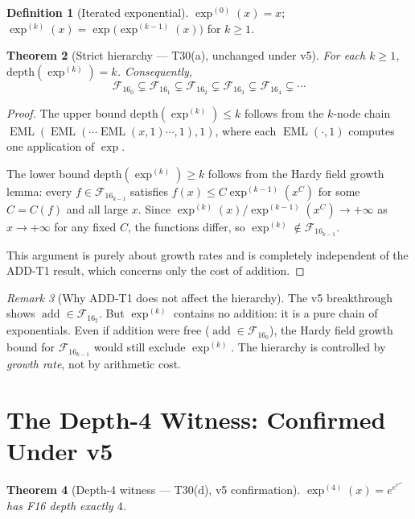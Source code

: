 \documentclass[12pt,a4paper]{article}
\newtheorem{theorem}{Theorem}[section]
\theoremstyle{definition}
\newtheorem{definition}[theorem]{Definition}
\theoremstyle{remark}
\newtheorem{remark}[theorem]{Remark}
\newcommand{\EML}{\operatorname{EML}}
\newcommand{\addop}{\operatorname{add}}
\newcommand{\F}{\mathcal{F}_{16}}
\begin{document}
\begin{definition}[Iterated exponential]
$\exp^{(0)}(x) = x$;\quad
$\exp^{(k)}(x) = \exp\!\bigl(\exp^{(k-1)}(x)\bigr)$ for $k \geq 1$.
\end{definition}

\begin{theorem}[Strict hierarchy — T30(a), unchanged under v5]
\label{thm:hierarchy}
For each $k \geq 1$, $\mathrm{depth}(\exp^{(k)}) = k$.  Consequently,
\[
  \F_0 \subsetneq \F_1 \subsetneq \F_2 \subsetneq \F_3 \subsetneq \F_4 \subsetneq \cdots
\]
\end{theorem}

\begin{proof}
The upper bound $\mathrm{depth}(\exp^{(k)}) \leq k$ follows from the $k$-node chain
$\EML(\EML(\cdots\EML(x,1)\cdots,1),1)$, where each $\EML(\cdot,1)$ computes one
application of $\exp$.

The lower bound $\mathrm{depth}(\exp^{(k)}) \geq k$ follows from the Hardy field
growth lemma: every $f \in \F_{k-1}$ satisfies $f(x) \leq C\exp^{(k-1)}(x^C)$
for some $C = C(f)$ and all large $x$.  Since
$\exp^{(k)}(x) / \exp^{(k-1)}(x^C) \to +\infty$ as $x\to+\infty$ for any
fixed $C$, the functions differ, so $\exp^{(k)} \notin \F_{k-1}$.

This argument is purely about growth rates and is completely independent of the
ADD-T1 result, which concerns only the cost of addition.
\end{proof}

\begin{remark}[Why ADD-T1 does not affect the hierarchy]
The v5 breakthrough shows $\addop \in \F_2$.  But $\exp^{(k)}$ contains no
addition: it is a pure chain of exponentials.  Even if addition were free
($\addop \in \F_0$), the Hardy field growth bound for $\F_{k-1}$ would still
exclude $\exp^{(k)}$.  The hierarchy is controlled by \emph{growth rate}, not
by arithmetic cost.
\end{remark}

\section{The Depth-4 Witness: Confirmed Under v5}
\label{sec:witness}

\begin{theorem}[Depth-4 witness — T30(d), v5 confirmation]
\label{thm:d4}
$\exp^{(4)}(x) = e^{e^{e^{e^x}}}$ has F16 depth exactly $4$.
\end{theorem}
\end{document}
